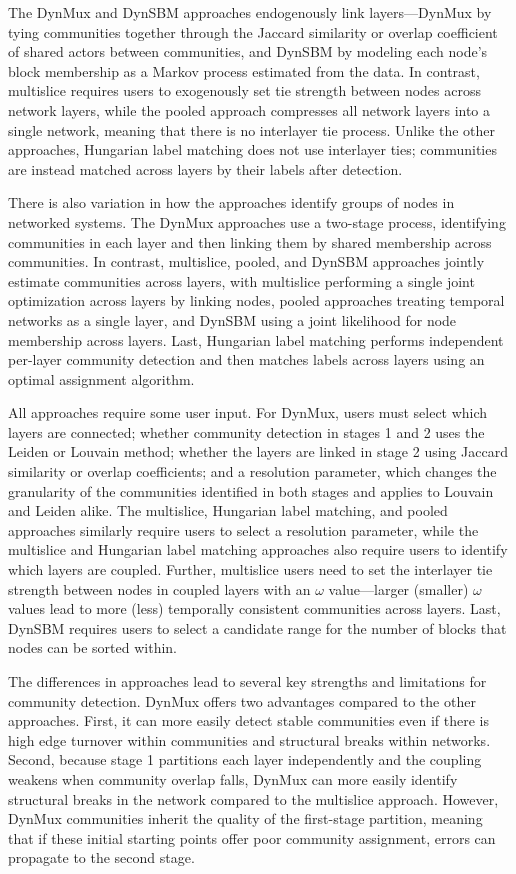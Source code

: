 \documentclass[11pt, letterpaper]{article}
\begin{document}
The DynMux and DynSBM approaches endogenously link layers---DynMux by tying communities together through the Jaccard similarity or overlap coefficient of shared actors between communities, and DynSBM by modeling each node's block membership as a Markov process estimated from the data. In contrast, multislice requires users to exogenously set tie strength between nodes across network layers, while the pooled approach compresses all network layers into a single network, meaning that there is no interlayer tie process. Unlike the other approaches, Hungarian label matching does not use interlayer ties; communities are instead matched across layers by their labels after detection.

There is also variation in how the approaches identify groups of nodes in networked systems. The DynMux approaches use a two-stage process, identifying communities in each layer and then linking them by shared membership across communities. In contrast, multislice, pooled, and DynSBM approaches jointly estimate communities across layers, with multislice performing a single joint optimization across layers by linking nodes, pooled approaches treating temporal networks as a single layer, and DynSBM using a joint likelihood for node membership across layers. Last, Hungarian label matching performs independent per-layer community detection and then matches labels across layers using an optimal assignment algorithm.

All approaches require some user input. For DynMux, users must select which layers are connected; whether community detection in stages 1 and 2 uses the Leiden or Louvain method; whether the layers are linked in stage 2 using Jaccard similarity or overlap coefficients; and a resolution parameter, which changes the granularity of the communities identified in both stages and applies to Louvain and Leiden alike. The multislice, Hungarian label matching, and pooled approaches similarly require users to select a resolution parameter, while the multislice and Hungarian label matching approaches also require users to identify which layers are coupled. Further, multislice users need to set the interlayer tie strength between nodes in coupled layers with an $\omega$ value---larger (smaller) $\omega$ values lead to more (less) temporally consistent communities across layers. Last, DynSBM requires users to select a candidate range for the number of blocks that nodes can be sorted within.

The differences in approaches lead to several key strengths and limitations for community detection. DynMux offers two advantages compared to the other approaches. First, it can more easily detect stable communities even if there is high edge turnover within communities and structural breaks within networks. Second, because stage 1 partitions each layer independently and the coupling weakens when community overlap falls, DynMux can more easily identify structural breaks in the network compared to the multislice approach. However, DynMux communities inherit the quality of the first-stage partition, meaning that if these initial starting points offer poor community assignment, errors can propagate to the second stage.
\end{document}
